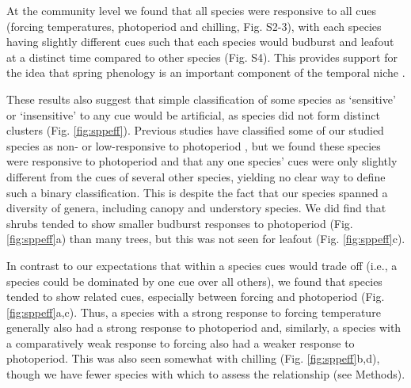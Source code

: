 \documentclass[11pt]{article}
\begin{document}
At the community level we found that all species were responsive to all cues (forcing temperatures, photoperiod and chilling, Fig. S2-3), with each species having slightly different cues such that each species would budburst and leafout at a distinct time compared to other species (Fig. S4). This provides support for the idea that spring phenology is an important component of the temporal niche \citep{gotelli1996,Loreau:2008xy}. 

These results also suggest that simple classification of some species as `sensitive' or `insensitive' to any cue would be artificial, as species did not form distinct clusters (Fig. \ref{fig:sppeff}). Previous studies have classified some of our studied species as non- or low-responsive to photoperiod \citep[i.e., \emph{Alnus incana, Aronia melanocarpa,}][]{zohner2016ncc}, but we found these species were responsive to photoperiod and that any one species' cues were only slightly different from the cues of several other species, yielding no clear way to define such a binary classification. This is despite the fact that our species spanned a diversity of genera, including canopy and understory species. We did find that shrubs tended to show smaller budburst responses to photoperiod (Fig. \ref{fig:sppeff}a) than many trees, but this was not seen for leafout (Fig. \ref{fig:sppeff}c). 

In contrast to our expectations that within a species cues would trade off (i.e., a species could be dominated by one cue over all others), we found that species tended to show related cues, especially between forcing and photoperiod (Fig. \ref{fig:sppeff}a,c). Thus, a species with a strong response to forcing temperature generally also had a strong response to photoperiod and, similarly, a species with a comparatively weak response to forcing also had a weaker response to photoperiod. This was also seen somewhat with chilling (Fig. \ref{fig:sppeff}b,d), though we have fewer species with which to assess the relationship (see Methods). 
\end{document}
